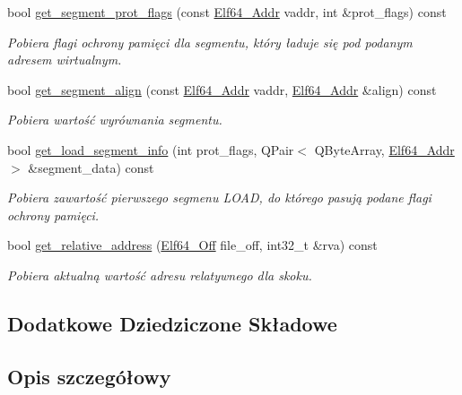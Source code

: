 \begin{DoxyCompactItemize}
bool \hyperlink{class_e_l_f_ac6ba067b4210f37293eff8483edaa883}{get\-\_\-segment\-\_\-prot\-\_\-flags} (const \hyperlink{elf_8h_aeed51d08e3a950d637f8ec1f0cd4ef65}{Elf64\-\_\-\-Addr} vaddr, int \&prot\-\_\-flags) const 
\begin{DoxyCompactList}\small\item\em Pobiera flagi ochrony pamięci dla segmentu, który ładuje się pod podanym adresem wirtualnym. \end{DoxyCompactList}\item 
bool \hyperlink{class_e_l_f_ad1eda85b8a7dc46325193c19074dd468}{get\-\_\-segment\-\_\-align} (const \hyperlink{elf_8h_aeed51d08e3a950d637f8ec1f0cd4ef65}{Elf64\-\_\-\-Addr} vaddr, \hyperlink{elf_8h_aeed51d08e3a950d637f8ec1f0cd4ef65}{Elf64\-\_\-\-Addr} \&align) const 
\begin{DoxyCompactList}\small\item\em Pobiera wartość wyrównania segmentu. \end{DoxyCompactList}\item 
bool \hyperlink{class_e_l_f_a48849fcd82256a378da6f6cfb4d7001a}{get\-\_\-load\-\_\-segment\-\_\-info} (int prot\-\_\-flags, Q\-Pair$<$ Q\-Byte\-Array, \hyperlink{elf_8h_aeed51d08e3a950d637f8ec1f0cd4ef65}{Elf64\-\_\-\-Addr} $>$ \&segment\-\_\-data) const 
\begin{DoxyCompactList}\small\item\em Pobiera zawartość pierwszego segmenu L\-O\-A\-D, do którego pasują podane flagi ochrony pamięci. \end{DoxyCompactList}\item 
bool \hyperlink{class_e_l_f_a480f02b85a48aa18c1bc1ae23dba2b2f}{get\-\_\-relative\-\_\-address} (\hyperlink{elf_8h_a6f7837bc80df7a68291fce54ff088849}{Elf64\-\_\-\-Off} file\-\_\-off, int32\-\_\-t \&rva) const 
\begin{DoxyCompactList}\small\item\em Pobiera aktualną wartość adresu relatywnego dla skoku. \end{DoxyCompactList}\end{DoxyCompactItemize}
\subsection*{Dodatkowe Dziedziczone Składowe}


\subsection{Opis szczegółowy}


